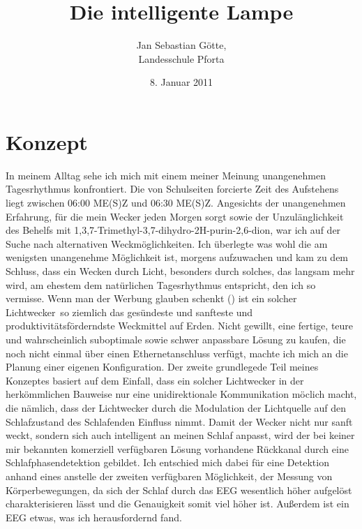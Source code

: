 \documentclass[12pt,a4paper,notitlepage]{article}
\date{8. Januar 2011}
\author{Jan Sebastian Götte,\\Landesschule Pforta}
\title{Die intelligente Lampe}
\begin{document}
\maketitle
\thispagestyle{empty}
\newpage
{}
\tableofcontents
\newpage
{}
\section{Konzept}
In meinem Alltag sehe ich mich mit einem meiner Meinung unangenehmen Tagesrhythmus konfrontiert. Die von Schulseiten forcierte Zeit des Aufstehens liegt zwischen 06:00 ME(S)Z und 06:30 ME(S)Z. Angesichts der unangenehmen Erfahrung, für die mein Wecker jeden Morgen sorgt sowie der Unzulänglichkeit des Behelfs mit 1,3,7-Trimethyl-3,7-dihydro-2H-purin-2,6-dion\cite{WP4}, war ich auf der Suche nach alternativen Weckmöglichkeiten. Ich überlegte was wohl die am wenigsten unangenehme Möglichkeit ist, morgens aufzuwachen und kam zu dem Schluss, dass ein Wecken durch Licht, besonders durch solches, das langsam mehr wird, am ehestem dem natürlichen Tagesrhythmus entspricht, den ich so vermisse. Wenn man der Werbung glauben schenkt (\cite{WERBUNG1}\cite{WERBUNG2}\cite{WERBUNG3}\cite{WERBUNG4}\cite{WERBUNG5}\cite{WERBUNG6}\cite{WERBUNG7}\cite{WERBUNG8}) ist ein solcher \glqq Lichtwecker\grqq\ so ziemlich das gesündeste und sanfteste und produktivitätsförderndste Weckmittel auf Erden\cite{SIESTA1}. Nicht gewillt, eine fertige, teure und wahrscheinlich suboptimale sowie schwer anpassbare Lösung zu kaufen, die noch nicht einmal über einen Ethernetanschluss verfügt, machte ich mich an die Planung einer eigenen Konfiguration. Der zweite grundlegede Teil meines Konzeptes basiert auf dem Einfall, dass ein solcher Lichtwecker in der herkömmlichen Bauweise nur eine unidirektionale Kommunikation möclich macht, die nämlich, dass der Lichtwecker durch die Modulation der Lichtquelle auf den Schlafzustand des Schlafenden Einfluss nimmt. Damit der Wecker nicht nur sanft weckt, sondern sich auch intelligent an meinen Schlaf anpasst, wird der bei keiner mir bekannten komerziell verfügbaren Lösung vorhandene Rückkanal durch eine Schlafphasendetektion gebildet. Ich entschied mich dabei für eine Detektion anhand eines  anstelle der zweiten verfügbaren Möglichkeit, der Messung von Körperbewegungen, da sich der Schlaf durch das EEG wesentlich höher aufgelöst charakterisieren lässt und die Genauigkeit somit viel höher ist. Außerdem ist ein EEG etwas, was ich herausfordernd fand.
\end{document}
